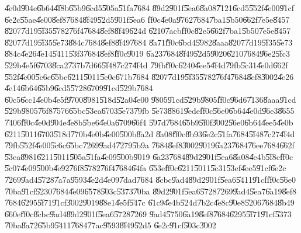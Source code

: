 \U{4e0d}\U{904e}\U{6b64}\U{4f8b}\U{65b9}\U{6cd5}\U{505a}\U{51fa}\U{7684}%
\U{89d2}\U{901f}\U{5ea6}\U{8a08}\U{7121}\U{6cd5}\U{552f}\U{4e00}\U{91cf}%
\U{6e2c}\U{55ae}\U{4e00}\U{8ef8}\U{7684}\U{8f49}\U{52d5}\U{901f}\U{5ea6}%
\U{ff0c}\U{4e0a}\U{9762}\U{7684}\U{7ba1}\U{5b50}\U{662f}\U{7e5e}\U{8457}%
\U{8207}\U{7d19}\U{5f35}\U{5782}\U{76f4}\U{7684}\U{8ef8}\U{8f49}\U{624d}%
\U{6210}\U{7acb}\U{ff0c}\U{82e5}\U{662f}\U{7ba1}\U{5b50}\U{7e5e}\U{8457}%
\U{8207}\U{7d19}\U{5f35}\U{5e73}\U{884c}\U{7684}\U{8ef8}\U{8f49}\U{7684}%
\U{8a71}\U{ff0c}\U{6bd4}\U{5982}\U{8aaa}\U{8207}\U{7d19}\U{5f35}\U{5e73}%
\U{884c}\U{4e26}\U{4e14}\U{5411}\U{53f3}\U{7684}\U{8ef8}\U{ff0c}\U{9019}%
\U{6a23}\U{7684}\U{8f49}\U{52d5}\U{9020}\U{6210}\U{7684}\U{96e2}\U{5fc3}%
\U{529b}\U{4e5f}\U{6703}\U{8ca2}\U{737b}\U{7d66}\U{5f48}\U{7c27}\U{4f4d}%
\U{79fb}\U{ff0c}\U{6240}\U{4ee5}\U{4f4d}\U{79fb}\U{5c31}\U{4e0d}\U{662f}%
\U{552f}\U{4e00}\U{5c6c}\U{65bc}\U{6211}\U{5011}\U{5e0c}\U{671b}\U{7684}%
\U{8207}\U{7d19}\U{5f35}\U{5782}\U{76f4}\U{7684}\U{8ef8}\U{3002}\U{4e26}%
\U{4e14}\U{6b64}\U{65b9}\U{6cd5}\U{5728}\U{6709}\U{91cd}\U{529b}\U{7684}%
\U{60c5}\U{6cc1}\U{4e0b}\U{4e5f}\U{9700}\U{8981}\U{518d}\U{52a0}\U{4e00}%
\U{9805}\U{91cd}\U{529b}\U{9805}\U{ff0c}\U{96d6}\U{7136}\U{8aaa}\U{91cd}%
\U{529b}\U{9805}\U{76f8}\U{7576}\U{65bc}\U{53ea}\U{6703}\U{5e73}\U{79fb}%
\U{5e73}\U{8861}\U{9ede}\U{ff0c}\U{56e0}\U{6b64}\U{4e0d}\U{96e3}\U{8655}%
\U{7406}\U{ff0c}\U{4e0d}\U{904e}\U{4e8b}\U{5be6}\U{4e0a}\U{6709}\U{66f4}%
\U{597d}\U{7684}\U{65b9}\U{5f0f}\U{3002}\U{56e0}\U{6b64}\U{4ee5}\U{4e0b}%
\U{6211}\U{5011}\U{6703}\U{518d}\U{770b}\U{4e0b}\U{4e00}\U{500b}\U{8a2d}%
\U{8a08}\U{ff0c}\U{8b93}\U{6e2c}\U{51fa}\U{7684}\U{5f48}\U{7c27}\U{4f4d}%
\U{79fb}\U{552f}\U{4e00}\U{5c6c}\U{65bc}\U{7269}\U{9ad4}\U{7279}\U{5b9a}%
\U{7684}\U{8ef8}\U{3002}\U{9019}\U{6a23}\U{7684}\U{76ee}\U{7684}\U{662f}%
\U{53ea}\U{8981}\U{6211}\U{5011}\U{505a}\U{51fa}\U{4e09}\U{500b}\U{9019}%
\U{6a23}\U{7684}\U{89d2}\U{901f}\U{5ea6}\U{8a08}\U{4e4b}\U{5f8c}\U{ff0c}%
\U{5c07}\U{4e09}\U{500b}\U{4e92}\U{76f8}\U{5782}\U{76f4}\U{7684}\U{64fa}%
\U{653e}\U{ff0c}\U{6211}\U{5011}\U{5c31}\U{53ef}\U{4ee5}\U{91cf}\U{6e2c}%
\U{7269}\U{9ad4}\U{5728}\U{7a7a}\U{9593}\U{4e2d}\U{4e09}\U{7dad}\U{7684}%
\U{8cbc}\U{9ad4}\U{89d2}\U{901f}\U{5ea6}\U{5411}\U{91cf}\U{ff0c}\U{56e0}%
\U{70ba}\U{91cf}\U{5230}\U{7684}\U{4e09}\U{6578}\U{503c}\U{5373}\U{70ba}%
\U{89d2}\U{901f}\U{5ea6}\U{5728}\U{7269}\U{9ad4}\U{5ea7}\U{6a19}\U{8ef8}%
\U{7684}\U{6295}\U{5f71}\U{91cf}\U{3002}\U{9019}\U{88e1}\U{4e5f}\U{547c}%
\U{61c9}\U{4e4b}\U{524d}\U{7b2c}\U{4e8c}\U{90e8}\U{5206}\U{7684}\U{8b49}%
\U{660e}\U{ff0c}\U{8cbc}\U{9ad4}\U{89d2}\U{901f}\U{5ea6}\U{5728}\U{7269}%
\U{9ad4}\U{5750}\U{6a19}\U{8ef8}\U{7684}\U{6295}\U{5f71}\U{91cf}\U{5373}%
\U{70ba}\U{8a72}\U{65b9}\U{5411}\U{7684}\U{77ac}\U{9593}\U{8f49}\U{52d5}%
\U{6e2c}\U{91cf}\U{503c}\U{3002}

